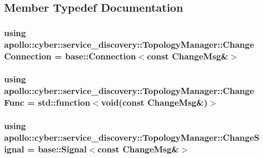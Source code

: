 \subsection{Member Typedef Documentation}
\hypertarget{classapollo_1_1cyber_1_1service__discovery_1_1TopologyManager_a9e207f3236b725d74eb37e5d27551ae6}{
\subsubsection[{Change\-Connection}]{\setlength{\rightskip}{0pt plus 5cm}using {\bf apollo\-::cyber\-::service\-\_\-discovery\-::\-Topology\-Manager\-::\-Change\-Connection} =  {\bf base\-::\-Connection}$<$const Change\-Msg\&$>$}}\label{classapollo_1_1cyber_1_1service__discovery_1_1TopologyManager_a9e207f3236b725d74eb37e5d27551ae6}
\hypertarget{classapollo_1_1cyber_1_1service__discovery_1_1TopologyManager_a50328f9e6813bf53a9e974bb39f716f5}{
\subsubsection[{Change\-Func}]{\setlength{\rightskip}{0pt plus 5cm}using {\bf apollo\-::cyber\-::service\-\_\-discovery\-::\-Topology\-Manager\-::\-Change\-Func} =  std\-::function$<$void(const Change\-Msg\&)$>$}}\label{classapollo_1_1cyber_1_1service__discovery_1_1TopologyManager_a50328f9e6813bf53a9e974bb39f716f5}
\hypertarget{classapollo_1_1cyber_1_1service__discovery_1_1TopologyManager_a7ba67fa3500a132796c24cd4aa7356f6}{
\subsubsection[{Change\-Signal}]{\setlength{\rightskip}{0pt plus 5cm}using {\bf apollo\-::cyber\-::service\-\_\-discovery\-::\-Topology\-Manager\-::\-Change\-Signal} =  {\bf base\-::\-Signal}$<$const Change\-Msg\&$>$}}\label{classapollo_1_1cyber_1_1service__discovery_1_1TopologyManager_a7ba67fa3500a132796c24cd4aa7356f6}
